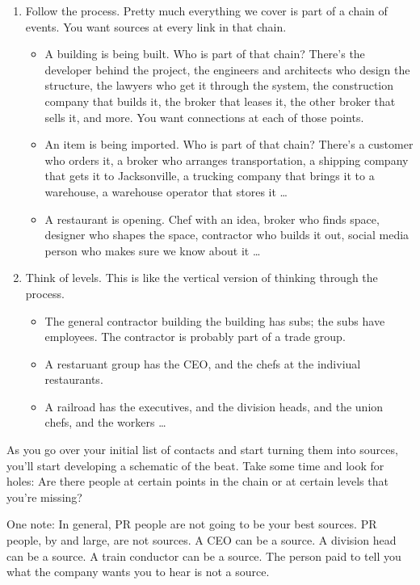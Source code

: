 \documentclass[
  12pt,
  american,
  letterpaperpaper,
  extrafontsizes,onecolumn,openright
  ]{memoir}
\providecommand{\tightlist}{%
  \setlength{\itemsep}{0pt}\setlength{\parskip}{0pt}}
\begin{document}
\begin{enumerate}
\def\labelenumi{\arabic{enumi}.}
\tightlist
\item
  Follow the process. Pretty much everything we cover is part of a chain of events. You want sources at every link in that chain.

  \begin{itemize}
  \tightlist
  \item
    A building is being built. Who is part of that chain? There's the developer behind the project, the engineers and architects who design the structure, the lawyers who get it through the system, the construction company that builds it, the broker that leases it, the other broker that sells it, and more. You want connections at each of those points.
  \item
    An item is being imported. Who is part of that chain? There's a customer who orders it, a broker who arranges transportation, a shipping company that gets it to Jacksonville, a trucking company that brings it to a warehouse, a warehouse operator that stores it \ldots{}
  \item
    A restaurant is opening. Chef with an idea, broker who finds space, designer who shapes the space, contractor who builds it out, social media person who makes sure we know about it \ldots{}
  \end{itemize}
\item
  Think of levels. This is like the vertical version of thinking through the process.

  \begin{itemize}
  \tightlist
  \item
    The general contractor building the building has subs; the subs have employees. The contractor is probably part of a trade group.
  \item
    A restaruant group has the CEO, and the chefs at the indiviual restaurants.
  \item
    A railroad has the executives, and the division heads, and the union chefs, and the workers \ldots{}
  \end{itemize}
\end{enumerate}

As you go over your initial list of contacts and start turning them into sources, you'll start developing a schematic of the beat. Take some time and look for holes: Are there people at certain points in the chain or at certain levels that you're missing?

One note: In general, PR people are not going to be your best sources. PR people, by and large, are not sources. A CEO can be a source. A division head can be a source. A train conductor can be a source. The person paid to tell you what the company wants you to hear is not a source.
\end{document}
